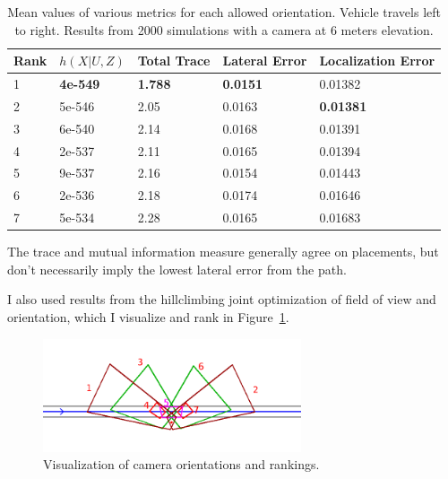 \documentclass[a4paper,12pt,twoside,openright]{report}
\begin{document}
\begin{table}[htb]
    \centering
    \caption[Metrics For Single Camera, Straight Road]{Mean values of various metrics for each allowed orientation. Vehicle travels left to right. Results from 2000 simulations with a camera at 6 meters elevation.}
    \label{tab:straightroad80m}
    \begin{tabular}{@{}lllll@{}}
        \toprule
        Rank & $h(X|U, Z)$ & Total Trace & Lateral Error & Localization Error \\ \midrule
        1    & \textbf{4e-549} & \textbf{1.788}  & \textbf{0.0151}        & 0.01382   \\
        2    & 5e-546    & 2.05        & 0.0163        & \textbf{0.01381}              \\
        3    & 6e-540    & 2.14        & 0.0168        & 0.01391 \\
        4    & 2e-537    & 2.11        & 0.0165        & 0.01394                  \\
        5    & 9e-537    & 2.16        & 0.0154        & 0.01443                   \\
        6    & 2e-536    & 2.18        & 0.0174        & 0.01646                   \\
        7    & 5e-534    & 2.28        & 0.0165        & 0.01683             
    \end{tabular}
\end{table}

The trace and mutual information measure generally agree on placements, but don't
necessarily imply the lowest lateral error from the path. 

I also used results from the hillclimbing joint optimization of field of view and
orientation, which I visualize and rank in Figure~\ref{fig:straightroad160multi}.

\begin{figure}[htb]
    \centering
    \includegraphics[width=3in]{figures/straightroad_160m_singlecamera_multifov.png}
    \caption[Single Camera Optimization Using MI]{Visualization of camera orientations and rankings.}
    \label{fig:straightroad160multi}
\end{figure}
\end{document}
